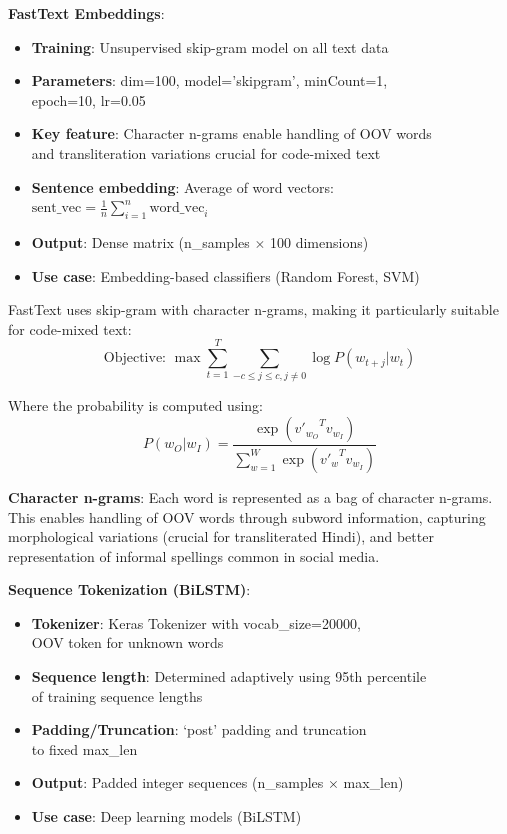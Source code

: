 \documentclass[11pt]{article}
\begin{document}
\textbf{FastText Embeddings}:
\begin{itemize}
\item \textbf{Training}: Unsupervised skip-gram model on all text data
\item \textbf{Parameters}: dim=100, model='skipgram', minCount=1,\\ epoch=10, lr=0.05
\item \textbf{Key feature}: Character n-grams enable handling of OOV words\\ and transliteration variations crucial for code-mixed text
\item \textbf{Sentence embedding}: Average of word vectors: $\text{sent\_vec} = \frac{1}{n}\sum_{i=1}^{n} \text{word\_vec}_i$
\item \textbf{Output}: Dense matrix (n\_samples $\times$ 100 dimensions)
\item \textbf{Use case}: Embedding-based classifiers (Random Forest, SVM)
\end{itemize}

FastText uses skip-gram with character n-grams, making it particularly suitable for code-mixed text:
\begin{equation}
\text{Objective: } \max \sum_{t=1}^{T} \sum_{-c \leq j \leq c, j \neq 0} \log P(w_{t+j} | w_t)
\end{equation}

Where the probability is computed using:
\begin{equation}
P(w_O | w_I) = \frac{\exp({v'_{w_O}}^T v_{w_I})}{\sum_{w=1}^{W} \exp({v'_w}^T v_{w_I})}
\end{equation}

\textbf{Character n-grams}: Each word is represented as a bag of character n-grams. This enables handling of OOV words through subword information, capturing morphological variations (crucial for transliterated Hindi), and better representation of informal spellings common in social media.

\textbf{Sequence Tokenization (BiLSTM)}:
\begin{itemize}
\item \textbf{Tokenizer}: Keras Tokenizer with vocab\_size=20000,\\ OOV token for unknown words
\item \textbf{Sequence length}: Determined adaptively using 95th percentile\\ of training sequence lengths
\item \textbf{Padding/Truncation}: `post' padding and truncation\\ to fixed max\_len
\item \textbf{Output}: Padded integer sequences (n\_samples $\times$ max\_len)
\item \textbf{Use case}: Deep learning models (BiLSTM)
\end{itemize}
\end{document}

